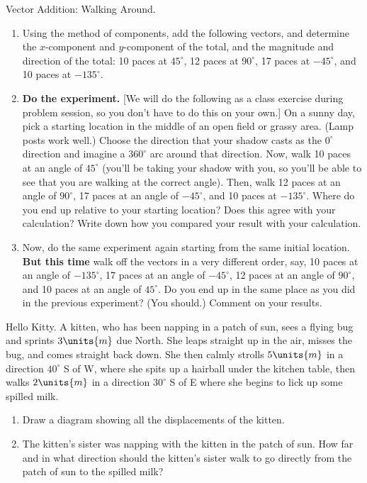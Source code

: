 \begin{aproblem}{Vector Addition: Walking Around.}
  \begin{enumerate}
  \item Using the method of components, add the following vectors, and
    determine the $x$-component and $y$-component of the total, and
    the magnitude and direction of the total: 10 paces at $45^\circ$,
    12 paces at $90^\circ$, 17 paces at $-45^\circ$, and 10 paces at
    $-135^\circ$.

  \item {\bf Do the experiment.}  [We will do the following as a class
    exercise during problem session, so you don't have to do this on
    your own.]  On a sunny day, pick a starting location in the middle
    of an open field or grassy area. (Lamp posts work well.)  Choose
    the direction that your shadow casts as the $0^\circ$ direction
    and imagine a $360^\circ$ arc around that direction.  Now, walk 10
    paces at an angle of $45^\circ$ (you'll be taking your shadow with
    you, so you'll be able to see that you are walking at the correct
    angle).  Then, walk 12 paces at an angle of $90^\circ$, 17 paces
    at an angle of $-45^\circ$, and 10 paces at $-135^\circ$.  Where
    do you end up relative to your starting location?  Does this agree
    with your calculation?  Write down how you compared your result
    with your calculation.

  \item Now, do the same experiment again starting from the same
    initial location.  {\bf But this time} walk off the vectors in a
    very different order, say, 10 paces at an angle of $-135^\circ$,
    17 paces at an angle of $-45^\circ$, 12 paces at an angle of
    $90^\circ$, and 10 paces at an angle of $45^\circ$.  Do you end up
    in the same place as you did in the previous experiment?  (You
    should.)  Comment on your results.
  \end{enumerate}
\end{aproblem}

\begin{aproblem}{Hello Kitty.}  
  A kitten, who has been napping in a patch of sun, sees a flying bug
  and sprints $3\units{m}$ due North.  She leaps straight up in the
  air, misses the bug, and comes straight back down.  She then calmly
  strolls $5\units{m}$ in a direction $40^\circ$ S of W, where she
  spits up a hairball under the kitchen table, then walks $2\units{m}$
  in a direction $30^\circ$ S of E where she begins to lick up some
  spilled milk.
  \begin{enumerate}
  \item Draw a diagram showing all the displacements of the kitten.
  \item The kitten's sister was napping with the kitten in the patch
    of sun.  How far and in what direction should the kitten's sister
    walk to go directly from the patch of sun to the spilled milk?
  \end{enumerate}
\end{aproblem}



